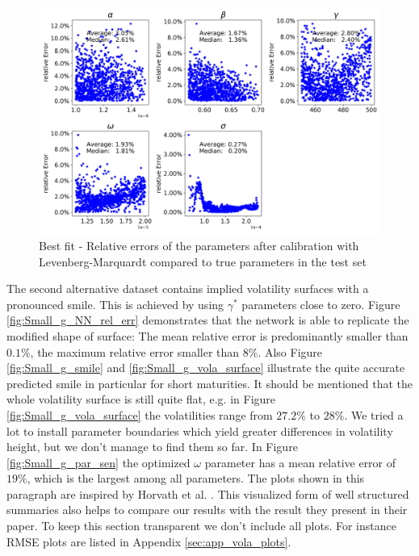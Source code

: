 \documentclass{article}
\begin{document}
\begin{figure}[!ht]
\centering
\includegraphics[width=\textwidth]{Low_error_Vola_HNG_ParameterRelativeErrors.png}
\caption{Best fit - Relative errors of the parameters after calibration with Levenberg-Marquardt compared to true parameters in the test set}
\label{fig:low_err_par_sen}
\end{figure}
The second alternative dataset contains implied volatility surfaces with a pronounced smile. This is achieved by using $\gamma^*$ parameters close to zero. Figure \ref{fig:Small_g_NN_rel_err} demonstrates that the network is able to replicate the modified shape of surface: The mean relative error is predominantly smaller than $0.1\%$, the maximum relative error smaller than $8\%$. Also Figure \ref{fig:Small_g_smile} and \ref{fig:Small_g_vola_surface} illustrate the quite accurate predicted smile in particular for short maturities. It should be mentioned that the whole volatility surface is still quite flat, e.g. in Figure \ref{fig:Small_g_vola_surface} the volatilities range from $27.2\%$ to $28\%$. We tried a lot to install parameter boundaries which yield greater differences in volatility height, but we don't manage to find them so far. \newline
In Figure \ref{fig:Small_g_par_sen} the optimized $\omega$ parameter has a mean relative error of $19\%$, which is the largest among all parameters. \newline
The plots shown in this paragraph are inspired by Horvath et al. \cite{Blanka}. This visualized form of well structured summaries also helps to compare our results with the result they present in their paper. To keep this section transparent we don't include all plots. For instance RMSE plots are listed in Appendix \ref{sec:app_vola_plots}.
\end{document}
